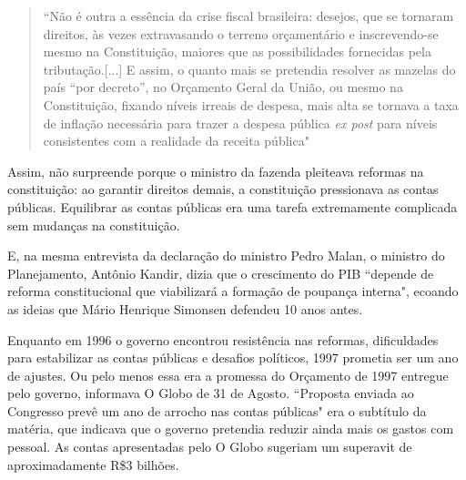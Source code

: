 \documentclass{article}
\begin{document}
\begin{quote}
``Não é outra a essência da crise fiscal brasileira: desejos, que se tornaram direitos, às vezes extravasando o terreno orçamentário e inscrevendo-se mesmo na Constituição, maiores que as possibilidades fornecidas pela tributação.[...] E assim, o quanto mais se pretendia resolver as mazelas do país “por decreto”, no Orçamento Geral da União, ou mesmo na Constituição, fixando níveis irreais de despesa, mais alta se tornava a taxa de inflação necessária para trazer a despesa pública \textit{ex post} para níveis consistentes com a realidade da receita pública" \citep{Francoxxxx}
\end{quote}

Assim, não surpreende porque o ministro da fazenda pleiteava reformas na constituição: ao garantir direitos demais, a constituição pressionava as contas públicas. Equilibrar as contas públicas era uma tarefa extremamente complicada sem mudanças na constituição. 

E, na mesma entrevista da declaração do ministro Pedro Malan, o ministro do Planejamento, Antônio Kandir, dizia que o crescimento do PIB ``depende de reforma constitucional que viabilizará a formação de poupança interna", ecoando as ideias que Mário Henrique Simonsen defendeu 10 anos antes.  

Enquanto em 1996 o governo encontrou resistência nas reformas, dificuldades para estabilizar as contas públicas e desafios políticos, 1997 prometia ser um ano de ajustes. Ou pelo menos essa era a promessa do Orçamento de 1997 entregue pelo governo, informava O Globo de 31 de Agosto. ``Proposta enviada ao Congresso prevê um ano de arrocho nas contas públicas" era o subtítulo da matéria, que indicava que o governo pretendia reduzir ainda mais os gastos com pessoal. As contas apresentadas pelo O Globo sugeriam um superavit de aproximadamente R\$3 bilhões.
\end{document}
